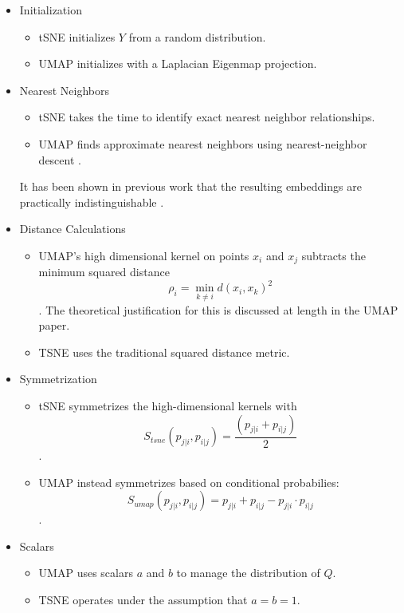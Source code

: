 \documentclass[sigconf, nonacm]{acmart}
\begin{document}
\begin{itemize}
    \item Initialization
        \begin{itemize}
        \item tSNE initializes $Y$ from a random distribution.
        \item UMAP initializes with a Laplacian Eigenmap projection.
        \end{itemize}

    \item Nearest Neighbors
        \begin{itemize}
        \item tSNE takes the time to identify exact nearest neighbor relationships.
        \item UMAP finds approximate nearest neighbors using nearest-neighbor descent \cite{dong2011efficient}.
        \end{itemize}
        It has been shown in previous work that the resulting embeddings are practically indistinguishable \cite{linderman2019fast}.

    \item Distance Calculations
        \begin{itemize}
        \item UMAP's high dimensional kernel on points $x_i$ and $x_j$ subtracts the minimum squared distance \[\rho_i = \min_{k \neq i} d(x_i, x_k)^2\].
            The theoretical justification for this is discussed at length in the UMAP paper. 
        \item TSNE uses the traditional squared distance metric.
        \end{itemize}

    \item Symmetrization
        \begin{itemize}
            \item tSNE symmetrizes the high-dimensional kernels with \[S_{tsne}(p_{j|i}, p_{i|j}) = \dfrac{(p_{j|i} + p_{i|j})}{2}\].
        \item UMAP instead symmetrizes based on conditional probabilies: \[S_{umap}(p_{j|i}, p_{i|j}) = p_{j|i} + p_{i|j} - p_{j|i} \cdot p_{i|j}\].
        \end{itemize}

    \item Scalars
        \begin{itemize}
        \item UMAP uses scalars $a$ and $b$ to manage the distribution of $Q$.
        \item TSNE operates under the assumption that $a = b = 1$.
        \end{itemize}


\end{itemize}
\end{document}
